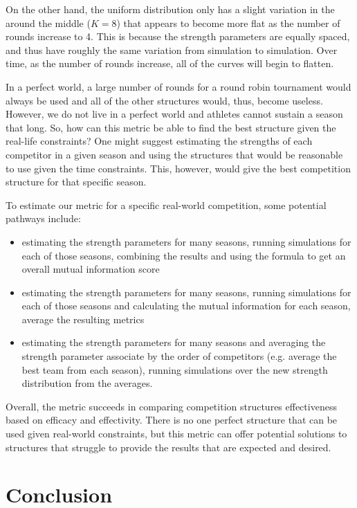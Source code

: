 \documentclass[
  12pt]{article}
\begin{document}
On the other hand, the uniform distribution only has a slight variation
in the around the middle (\(K = 8\)) that appears to become more flat as
the number of rounds increase to 4. This is because the strength
parameters are equally spaced, and thus have roughly the same variation
from simulation to simulation. Over time, as the number of rounds
increase, all of the curves will begin to flatten.

In a perfect world, a large number of rounds for a round robin
tournament would always be used and all of the other structures would,
thus, become useless. However, we do not live in a perfect world and
athletes cannot sustain a season that long. So, how can this metric be
able to find the best structure given the real-life constraints? One
might suggest estimating the strengths of each competitor in a given
season and using the structures that would be reasonable to use given
the time constraints. This, however, would give the best competition
structure for that specific season.

To estimate our metric for a specific real-world competition, some
potential pathways include:

\begin{itemize}
\item
  estimating the strength parameters for many seasons, running
  simulations for each of those seasons, combining the results and using
  the formula to get an overall mutual information score
\item
  estimating the strength parameters for many seasons, running
  simulations for each of those seasons and calculating the mutual
  information for each season, average the resulting metrics
\item
  estimating the strength parameters for many seasons and averaging the
  strength parameter associate by the order of competitors (e.g. average
  the best team from each season), running simulations over the new
  strength distribution from the averages.
\end{itemize}

Overall, the metric succeeds in comparing competition structures
effectiveness based on efficacy and effectivity. There is no one perfect
structure that can be used given real-world constraints, but this metric
can offer potential solutions to structures that struggle to provide the
results that are expected and desired.

\section{Conclusion}\label{sec:conclusion}
\end{document}
